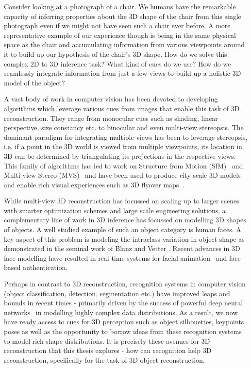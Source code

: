 \documentclass[../thesis.tex]{subfiles}
\begin{document}
Consider looking at a photograph of a chair. We humans have the remarkable capacity of inferring properties about the 3D shape of the chair from this single photograph even if we might not have seen such a chair ever before. A more representative example of our experience though is being in the same physical space as the chair and accumulating information from various viewpoints around it to build up our hypothesis of the chair’s 3D shape. How do we solve this complex 2D to 3D inference task? What kind of cues do we use? How do we seamlessly integrate information from just a few views to build up a holistic 3D model of the object?

A vast body of work in computer vision has been devoted to developing algorithms which leverage various cues from images that enable this task of 3D reconstruction. They range from monocular cues such as shading, linear perspective, size constancy etc. \cite{palmer1999vision} to binocular \cite{louis1960methods} and even multi-view stereopsis. The dominant paradigm for integrating multiple views has been to leverage stereopsis, i.e. if a point in the 3D world is viewed from multiple viewpoints, its location in 3D can be determined by triangulating its projections in the respective views. This family of algorithms has led to work on Structure from Motion (SfM)~\cite{17kruppa1913,longuet1981computer,TomasiKanade92} and Multi-view Stereo (MVS)~\cite{seitz2006comparison,furukawa2015multi} and have been used to produce city-scale 3D models~\cite{agarwal2011building} and enable rich visual experiences such as 3D flyover maps~\cite{kushal2012photo}.

While multi-view 3D reconstruction has focussed on scaling up to larger scenes with smarter optimization schemes and large scale engineering solutions, a complementary line of work in 3D inference has focussed on modelling 3D shapes of objects. A well studied example of such an object category is human faces. A key aspect of this problem is modeling the intraclass variation in object shape as demonstrated in the seminal work of Blanz and Vetter \cite{blanz1999morphable}. Recent advances \cite{kemelmacher2011internet,movingFace:eccv14} in 3D face modelling have resulted in real-time systems for facial animation~\cite{thies2016face} and face-based authentication. 

Perhaps in contrast to 3D reconstruction, recognition systems in computer vision (object classification, detection, segmentation etc.) have improved leaps and bounds in recent times - primarily driven by the success of powerful deep neural networks~\cite{Lecun89} in modelling highly complex data distributions. As a result, we now have ready access to cues for 3D perception such as object silhouettes, keypoints, poses as well as the opportunity to borrow ideas from these recognition systems to model rich shape distributions. It is precisely these avenues for 3D reconstruction that this thesis explores - how can recognition help 3D reconstruction, specifically for the task of 3D object reconstruction. 
\end{document}
